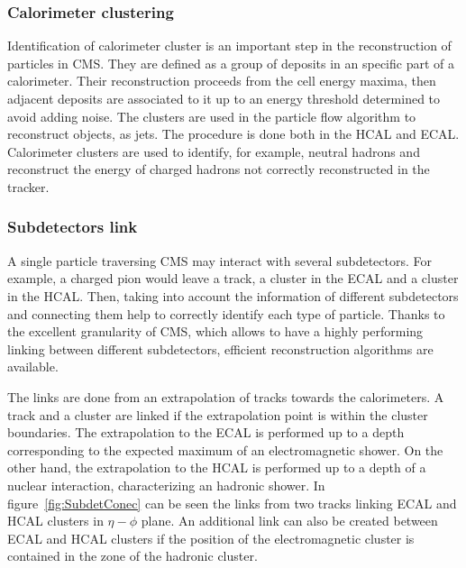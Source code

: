 \subsubsection{Calorimeter clustering}

Identification of calorimeter cluster is an important step in the reconstruction of particles in CMS. They are defined as a group of deposits in an specific part of a calorimeter. Their reconstruction proceeds from the cell energy maxima, then adjacent deposits are associated to it up to an energy threshold determined to avoid adding noise. The clusters are used in the particle flow algorithm to reconstruct objects, as jets. The procedure is done both in the HCAL and ECAL. Calorimeter clusters are used to identify, for example, neutral hadrons and reconstruct the energy of charged hadrons not correctly reconstructed in the tracker.    

\subsubsection{Subdetectors link}

A single particle traversing CMS may interact with several subdetectors. For example, a charged pion would leave a track, a cluster in the ECAL and a cluster in the HCAL. Then, taking into account the information of different subdetectors and connecting them help to correctly identify each type of particle. Thanks to the excellent granularity of CMS, which allows to have a highly performing linking between different subdetectors, efficient reconstruction algorithms are available. 

The links are done from an extrapolation of tracks towards the calorimeters. A track and a cluster are linked if the extrapolation point is within the cluster boundaries. The extrapolation to the ECAL is performed up to a depth corresponding to the expected maximum of an electromagnetic shower. On the other hand, the extrapolation to the HCAL is performed up to a  depth of a nuclear interaction, characterizing an hadronic shower. In figure~\ref{fig:SubdetConec} can be seen the links from two tracks linking ECAL and HCAL clusters in $\eta-\phi$ plane. An additional link can also be created between ECAL and HCAL clusters if the position of the electromagnetic cluster is contained in the zone of the hadronic cluster.

